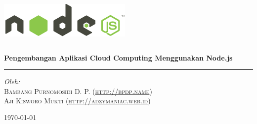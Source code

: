 \begin{titlepage}

\begin{center}

\includegraphics[scale=1]{images/logo-light.png}\\[1cm]

%

\hrule\vspace{5mm}
\noindent
{ \huge \bfseries Pengembangan Aplikasi Cloud Computing Menggunakan Node.js}\\[0.4cm]
\hrule\vspace{15mm}

\begin{center} \small
\emph{Oleh:}\\
\vspace{20mm}
\textsc{Bambang Purnomosidi D. P. (\url{http://bpdp.name})}\\
\textsc{Aji Kisworo Mukti (\url{http://adzymaniac.web.id})} 
\end{center}
\vfill

{\large \today}

\end{center}

\end{titlepage}
